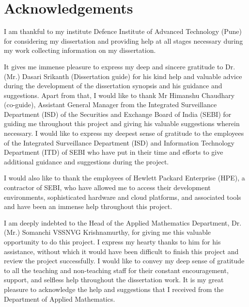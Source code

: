 \chapter*{Acknowledgements}

I am thankful to my institute Defence Institute of Advanced Technology (Pune) for considering my dissertation and providing help at all stages necessary during my work collecting information on my dissertation. \par

It gives me immense pleasure to express my deep and sincere gratitude to Dr.(Mr.) Dasari Srikanth (Dissertation guide) for his kind help and valuable advice during the development of the dissertation synopsis and his guidance and suggestions.
Apart from that, I would like to thank Mr Himanshu Chaudhary (co-guide), Assistant General Manager from the Integrated Surveillance Department (ISD) of the Securities and Exchange Board of India (SEBI) for guiding me throughout this project and giving his valuable suggestions wherein necessary. I would like to express my deepest sense of gratitude to the employees of the Integrated Surveillance Department (ISD) and Information Technology Department (ITD) of SEBI who have put in their time and efforts to give additional guidance and suggestions during the project. \par
I would also like to thank the employees of Hewlett Packard Enterprise (HPE), a contractor of SEBI, who have allowed me to access their development environments, sophisticated hardware and cloud platforms, and associated tools and have been an immense help throughout this project. \par
I am deeply indebted to the Head of the Applied Mathematics Department, Dr. (Mr.) Somanchi VSSNVG Krishnamurthy, for giving me this valuable opportunity to do this project. I express my hearty thanks to him for his assistance, without which it would have been difficult to finish this project and review the project successfully.
I would like to convey my deep sense of gratitude to all the teaching and non-teaching staff for their constant encouragement, support, and selfless help throughout the dissertation work. It is my great pleasure to acknowledge the help and suggestions that I received from the Department of Applied Mathematics.
